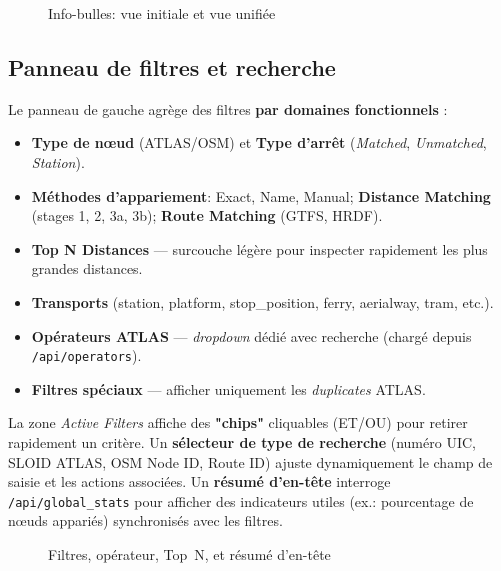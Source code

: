 \begin{figure}[h]
  \centering
  \caption{Info-bulles: vue initiale et vue unifiée}
  \label{fig:frontend-popups}
\end{figure}

\subsection{Panneau de filtres et recherche}
Le panneau de gauche agrège des filtres \textbf{par domaines fonctionnels} :
\begin{itemize}
  \item \textbf{Type de nœud} (ATLAS/OSM) et \textbf{Type d'arrêt} (\textit{Matched}, \textit{Unmatched}, \textit{Station}).
  \item \textbf{Méthodes d'appariement}: Exact, Name, Manual; \textbf{Distance Matching} (stages 1, 2, 3a, 3b); \textbf{Route Matching} (GTFS, HRDF).
  \item \textbf{Top N Distances} — surcouche légère pour inspecter rapidement les plus grandes distances.
  \item \textbf{Transports} (station, platform, stop\_position, ferry, aerialway, tram, etc.).
  \item \textbf{Opérateurs ATLAS} — \textit{dropdown} dédié avec recherche (chargé depuis \texttt{/api/operators}).
  \item \textbf{Filtres spéciaux} — afficher uniquement les \textit{duplicates} ATLAS.
\end{itemize}

La zone \textit{Active Filters} affiche des \textbf{"chips"} cliquables (ET/OU) pour retirer rapidement un critère. Un \textbf{sélecteur de type de recherche} (numéro UIC, SLOID ATLAS, OSM Node ID, Route ID) ajuste dynamiquement le champ de saisie et les actions associées. Un \textbf{résumé d'en-tête} interroge \texttt{/api/global\_stats} pour afficher des indicateurs utiles (ex.: pourcentage de nœuds appariés) synchronisés avec les filtres.

\begin{figure}[h]
  \centering
  \caption{Filtres, opérateur, Top~N, et résumé d'en-tête}
  \label{fig:frontend-filters}
\end{figure}

